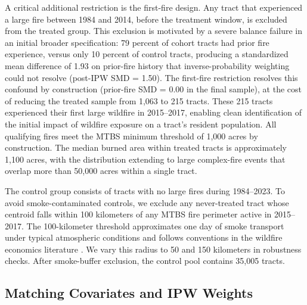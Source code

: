 \documentclass[12pt]{article}
\begin{document}
A critical additional restriction is the first-fire design.
Any tract that experienced a large fire between 1984 and 2014, before
the treatment window, is excluded from the treated group.
This exclusion is motivated by a severe balance failure in an initial
broader specification: 79 percent of cohort tracts had prior fire
experience, versus only 10 percent of control tracts, producing a
standardized mean difference of 1.93 on prior-fire history that
inverse-probability weighting could not resolve (post-IPW SMD = 1.50).
The first-fire restriction resolves this confound by construction
(prior-fire SMD = 0.00 in the final sample), at the cost of reducing
the treated sample from 1,063 to 215 tracts.
These 215 tracts experienced their first large wildfire in 2015--2017,
enabling clean identification of the initial impact of wildfire exposure
on a tract's resident population.
All qualifying fires meet the MTBS minimum threshold of 1,000 acres by construction.
The median burned area within treated tracts is approximately 1,100 acres,
with the distribution extending to large complex-fire events that overlap
more than 50,000 acres within a single tract.

The control group consists of tracts with no large fires
during 1984--2023.
To avoid smoke-contaminated controls, we exclude any never-treated tract
whose centroid falls within 100 kilometers of any MTBS fire perimeter
active in 2015--2017.
The 100-kilometer threshold approximates one day of smoke transport under
typical atmospheric conditions and follows conventions in the wildfire
economics literature \citep{borgschulte2024air}.
We vary this radius to 50 and 150 kilometers in robustness checks.
After smoke-buffer exclusion, the control pool contains 35,005 tracts.

\subsection{Matching Covariates and IPW Weights}
\end{document}
